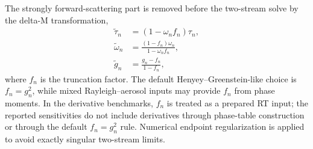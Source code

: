 \documentclass[gmd, manuscript]{copernicus}
\begin{document}
The strongly forward-scattering part is removed before the two-stream solve by the
delta-M transformation,
\begin{equation}
\begin{aligned}
\widetilde{\tau}_n &= (1-\omega_n f_n)\tau_n,\\
\widetilde{\omega}_n &= \frac{(1-f_n)\omega_n}{1-\omega_n f_n},\\
\widetilde{g}_n &= \frac{g_n-f_n}{1-f_n},
\end{aligned}
\label{eq:deltam}
\end{equation}
where $f_n$ is the truncation factor.  The default Henyey--Greenstein-like choice is
$f_n=g_n^2$, while mixed Rayleigh--aerosol inputs may provide $f_n$ from phase
moments.  In the derivative benchmarks, $f_n$ is treated as a prepared RT input; the
reported sensitivities do not include derivatives through phase-table construction or
through the default $f_n=g_n^2$ rule.  Numerical endpoint regularization is applied to
avoid exactly singular two-stream limits.
\end{document}
